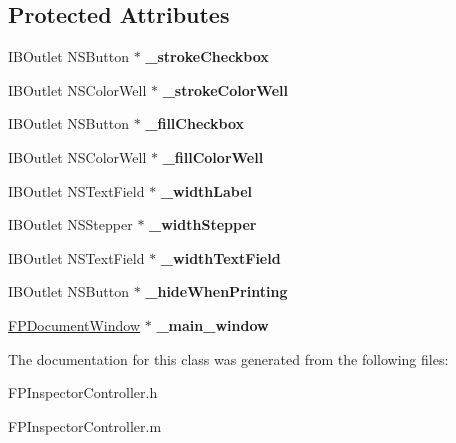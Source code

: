 \subsection*{Protected Attributes}
\begin{DoxyCompactItemize}
\item 
\mbox{\label{interface_f_p_inspector_controller_aca82012ce8d4f1dd4642b843858155bd}} 
I\+B\+Outlet N\+S\+Button $\ast$ {\bfseries \+\_\+stroke\+Checkbox}
\item 
\mbox{\label{interface_f_p_inspector_controller_a0977117737b2243eb48ce283ad19c84b}} 
I\+B\+Outlet N\+S\+Color\+Well $\ast$ {\bfseries \+\_\+stroke\+Color\+Well}
\item 
\mbox{\label{interface_f_p_inspector_controller_a01b60ab67f57b642f0510e7abff689be}} 
I\+B\+Outlet N\+S\+Button $\ast$ {\bfseries \+\_\+fill\+Checkbox}
\item 
\mbox{\label{interface_f_p_inspector_controller_a0f80e7cc04276a7739635eb44bbb88cd}} 
I\+B\+Outlet N\+S\+Color\+Well $\ast$ {\bfseries \+\_\+fill\+Color\+Well}
\item 
\mbox{\label{interface_f_p_inspector_controller_adfba913c570af1399dc5f47238d957ce}} 
I\+B\+Outlet N\+S\+Text\+Field $\ast$ {\bfseries \+\_\+width\+Label}
\item 
\mbox{\label{interface_f_p_inspector_controller_a2d79202870eb39045e616bbbbece8ea1}} 
I\+B\+Outlet N\+S\+Stepper $\ast$ {\bfseries \+\_\+width\+Stepper}
\item 
\mbox{\label{interface_f_p_inspector_controller_aab495423b7ea34970063c506b38f13ab}} 
I\+B\+Outlet N\+S\+Text\+Field $\ast$ {\bfseries \+\_\+width\+Text\+Field}
\item 
\mbox{\label{interface_f_p_inspector_controller_adae9d07fd6167ab8ce20ac3ae9c7cbe2}} 
I\+B\+Outlet N\+S\+Button $\ast$ {\bfseries \+\_\+hide\+When\+Printing}
\item 
\mbox{\label{interface_f_p_inspector_controller_ac7e0d95795565a9a94e3ec4c9efb6d05}} 
\mbox{\hyperlink{interface_f_p_document_window}{F\+P\+Document\+Window}} $\ast$ {\bfseries \+\_\+main\+\_\+window}
\end{DoxyCompactItemize}


The documentation for this class was generated from the following files\+:\begin{DoxyCompactItemize}
\item 
F\+P\+Inspector\+Controller.\+h\item 
F\+P\+Inspector\+Controller.\+m\end{DoxyCompactItemize}
